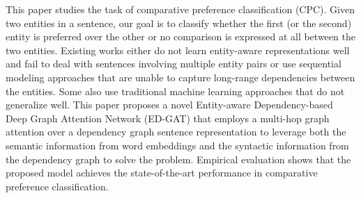 This paper studies the task of comparative preference classification (CPC). Given two entities in a sentence, our goal is to classify whether the first (or the second) entity is preferred over the other or no comparison is expressed at all between the two entities. Existing works either do not learn entity-aware representations well and fail to deal with sentences involving multiple entity pairs or use sequential modeling approaches that are unable to capture long-range dependencies between the entities. Some also use traditional machine learning approaches that do not generalize well. This paper proposes a novel Entity-aware Dependency-based Deep Graph Attention Network (ED-GAT) that employs a multi-hop graph attention over a dependency graph sentence representation to leverage both the semantic information from word embeddings and the syntactic information from the dependency graph to solve the problem. Empirical evaluation shows that the proposed model achieves the state-of-the-art performance in comparative preference classification.
